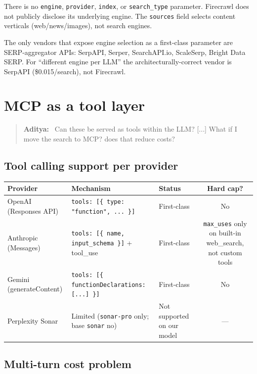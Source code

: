 \documentclass[11pt,letterpaper]{article}
\newenvironment{userturn}
  {\begin{quote}\small\color{brand}\textbf{Aditya:}~}
  {\end{quote}}
\begin{document}
There is no \texttt{engine}, \texttt{provider}, \texttt{index}, or
\texttt{search\_type} parameter. Firecrawl does not publicly disclose its
underlying engine. The \texttt{sources} field selects content verticals
(web/news/images), not search engines.

The only vendors that expose engine selection as a first-class parameter are
SERP-aggregator APIs: SerpAPI, Serper, SearchAPI.io, ScaleSerp, Bright Data
SERP. For ``different engine per LLM'' the architecturally-correct vendor is
SerpAPI (\$0.015/search), not Firecrawl.

\section{MCP as a tool layer}

\begin{userturn}
Can these be served as tools within the LLM? [...] What if I move the
search to MCP? does that reduce costs?
\end{userturn}

\subsection{Tool calling support per provider}

\begin{center}
\begin{tabular}{@{}lllc@{}}
\toprule
\textbf{Provider} & \textbf{Mechanism} & \textbf{Status} & \textbf{Hard cap?} \\
\midrule
OpenAI (Responses API)    & \texttt{tools: [\{ type: "function", ... \}]}              & First-class & No \\
Anthropic (Messages)      & \texttt{tools: [\{ name, input\_schema \}]} + tool\_use    & First-class & \texttt{max\_uses} only on built-in web\_search, not custom tools \\
Gemini (generateContent)  & \texttt{tools: [\{ functionDeclarations: [...] \}]}       & First-class & No \\
Perplexity Sonar          & Limited (\texttt{sonar-pro} only; base \texttt{sonar} no) & Not supported on our model & --- \\
\bottomrule
\end{tabular}
\end{center}

\subsection{Multi-turn cost problem}
\end{document}
